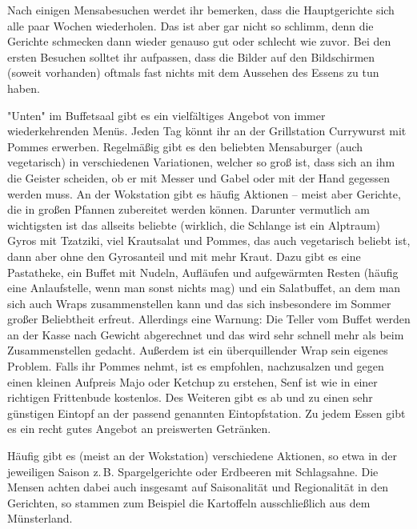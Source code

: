 \begin{multicols}{2}
Nach einigen Mensabesuchen werdet ihr bemerken, dass die Hauptgerichte sich alle paar Wochen wiederholen.
Das ist aber gar nicht so schlimm, denn die Gerichte schmecken dann wieder genauso gut oder schlecht wie zuvor.
Bei den ersten Besuchen solltet ihr aufpassen, dass die Bilder auf den Bildschirmen (soweit vorhanden) oftmals fast nichts mit dem Aussehen des Essens zu tun haben.


"Unten" im Buffetsaal gibt es ein vielfältiges Angebot von immer wiederkehrenden Menüs.
Jeden Tag könnt ihr an der Grillstation Currywurst mit Pommes erwerben.
Regelmäßig gibt es den beliebten Mensaburger (auch vegetarisch) in verschiedenen Variationen, welcher so groß ist, dass sich an ihm die Geister scheiden, ob er mit Messer und Gabel oder mit der Hand gegessen werden muss.
An der Wokstation gibt es häufig Aktionen – meist aber Gerichte, die in großen Pfannen zubereitet werden können. Darunter vermutlich am wichtigsten ist das allseits beliebte (wirklich, die Schlange ist ein Alptraum) Gyros mit Tzatziki, viel Krautsalat und Pommes, das auch vegetarisch beliebt ist, dann aber ohne den Gyrosanteil und mit mehr Kraut.
Dazu gibt es eine Pastatheke, ein Buffet mit Nudeln, Aufläufen und aufgewärmten Resten (häufig eine Anlaufstelle, wenn man sonst nichts mag) und ein Salatbuffet, an dem man sich auch Wraps zusammenstellen kann und das sich insbesondere im Sommer großer Beliebtheit erfreut. Allerdings eine Warnung: Die Teller vom Buffet werden an der Kasse nach Gewicht abgerechnet und das wird sehr schnell mehr als beim Zusammenstellen gedacht. Außerdem ist ein überquillender Wrap sein eigenes Problem.
Falls ihr Pommes nehmt, ist es empfohlen, nachzusalzen und gegen einen kleinen Aufpreis Majo oder Ketchup zu erstehen, Senf ist wie in einer richtigen Frittenbude kostenlos.
Des Weiteren gibt es ab und zu einen sehr günstigen Eintopf an der passend genannten Eintopfstation.
Zu jedem Essen gibt es ein recht gutes Angebot an preiswerten Getränken.

Häufig gibt es (meist an der Wokstation) verschiedene Aktionen, so etwa in der jeweiligen Saison z.\,B. Spargelgerichte oder Erdbeeren mit Schlagsahne. Die Mensen achten dabei auch insgesamt auf Saisonalität und Regionalität in den Gerichten, so stammen zum Beispiel die Kartoffeln ausschließlich aus dem Münsterland.


\end{multicols}

